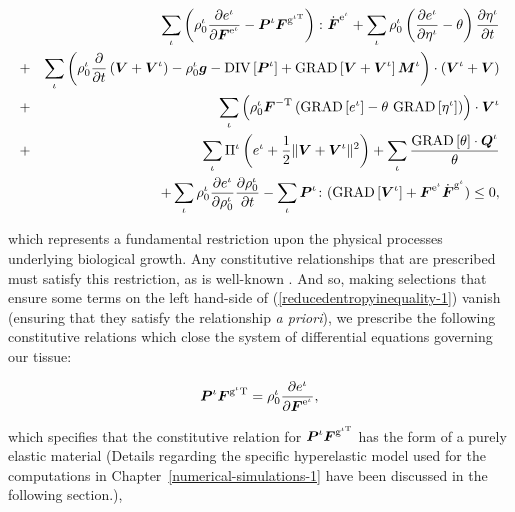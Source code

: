 \begin{eqnarray}
& &\sum\limits_{\iota}\left(\rho_{0}^{\iota}\frac{\partial
    e^\iota}{\partial\mbox{\boldmath$ F$}^{\mathrm{e}^\iota}} -
  \mbox{\boldmath$ P$}^\iota\mbox{\boldmath$ F$}^{\mathrm{g}^{\iota\mathrm{T}}}\right)
  \colon\dot{\mbox{\boldmath$ F$}}^{\mathrm{e}^\iota} +
  \sum\limits_{\iota}\rho_{0}^{\iota}\left(\frac{\partial
    e^\iota}{\partial
    \eta^\iota}-\theta\right)\frac{\partial\eta^\iota}{\partial
    t}\nonumber\\ &+&\sum\limits_{\iota}
  \left(\rho^\iota_0\frac{\partial}{\partial
    t}\left(\mbox{\boldmath$ V$}+\mbox{\boldmath$ V$}^\iota\right) - \rho_0^\iota\mbox{\boldmath$ g$} -
  \mathrm{DIV}\left[\mbox{\boldmath$ P$}^\iota\right] +
  \mathrm{GRAD}\left[\mbox{\boldmath$ V$}+\mbox{\boldmath$ V$}^\iota\right]\mbox{\boldmath$ M$}^\iota\right)
  \cdot(\mbox{\boldmath$ V$}^\iota+\mbox{\boldmath$ V$})\nonumber\\ &+&
  \sum\limits_{\iota}\left(\rho^\iota_0\mbox{\boldmath$ F$}^{-\mathrm{T}}  
  \left(\mathrm{GRAD}\left[e^\iota\right] -
    \theta\ \mathrm{GRAD}\left[\eta^\iota\right]\right)
    \right)\cdot\mbox{\boldmath$ V$}^\iota\nonumber\\  
    &+&\sum\limits_{\iota}\Pi^\iota\left(e^\iota
    + \frac{1}{2}\Vert\mbox{\boldmath$ V$}+\mbox{\boldmath$ V$}^\iota\Vert^2\right) +
    \sum\limits_{\iota} \frac{\mathrm{GRAD}\left[\theta\right]
      \cdot\mbox{\boldmath$ Q$}^\iota}{\theta}\nonumber\\  &  & + 
    \sum\limits_{\iota}\rho^\iota_0\frac{\partial
      e^\iota}{\partial\rho^\iota_0}\frac{\partial
      \rho^\iota_0}{\partial t} -
    \sum\limits_{\iota}\mbox{\boldmath$ P$}^\iota
    \colon(\mathrm{GRAD}\left[\mbox{\boldmath$ V$}^\iota\right] + 
    \mbox{\boldmath$ F$}^{\mathrm{e}^\iota}\dot{\mbox{\boldmath$ F$}}^{\mathrm{g}^\iota}) \leq 0,
\label{reducedentropyinequality-1}
\end{eqnarray}

\noindent which represents a fundamental restriction upon the physical
processes underlying biological growth. Any constitutive relationships
that are prescribed must satisfy this restriction, as is well-known
\citep{TruesdellToupin:60}. And so, making selections that ensure some
terms on the left hand-side of (\ref{reducedentropyinequality-1})
vanish (ensuring that they satisfy the relationship {\em a priori}),
we prescribe the following constitutive relations which close the
system of differential equations governing our tissue:

\begin{equation}
\mbox{\boldmath$ P$}^\iota\mbox{\boldmath$ F$}^{\mathrm{g}^\iota\mathrm{T}} = \rho_0^\iota
\frac{\partial e^\iota}{\partial\mbox{\boldmath$ F$}^{\mathrm{e}^\iota}},
\label{constitutive-relation-hyperelasticity}
\end{equation}

\noindent which specifies that the constitutive relation for
$\mbox{\boldmath$ P$}^\iota\mbox{\boldmath$ F$}^{\mathrm{g}^{\iota\mathrm{T}}}$ has the form of a purely
elastic material (Details regarding the specific hyperelastic model
used for the computations in Chapter~\ref{numerical-simulations-1}
have been discussed in the following section.),

